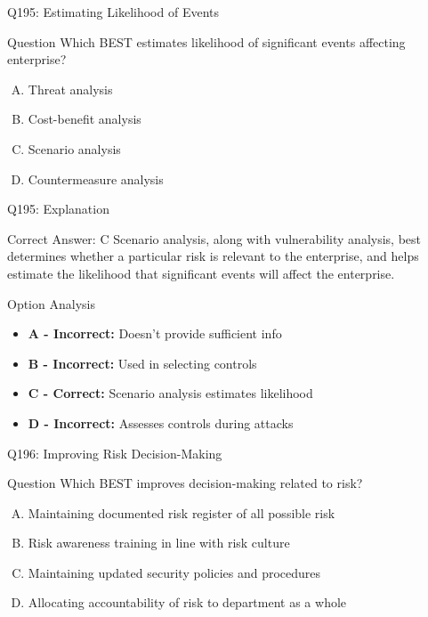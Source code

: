 \documentclass{beamer}
\begin{document}
	\begin{frame}{Q195: Estimating Likelihood of Events}
		\begin{block}{Question}
			Which BEST estimates likelihood of significant events affecting enterprise?
		\end{block}
		\begin{enumerate}[(A)]
			\item Threat analysis
			\item Cost-benefit analysis
			\item Scenario analysis
			\item Countermeasure analysis
		\end{enumerate}
	\end{frame}
	
	\begin{frame}{Q195: Explanation}
		\begin{block}{Correct Answer: C}
			Scenario analysis, along with vulnerability analysis, best determines whether a particular risk is relevant to the enterprise, and helps estimate the likelihood that significant events will affect the enterprise.
		\end{block}
		\begin{block}{Option Analysis}
			\begin{itemize}
				\item \textbf{A - Incorrect:} Doesn't provide sufficient info
				\item \textbf{B - Incorrect:} Used in selecting controls
				\item \textbf{C - Correct:} Scenario analysis estimates likelihood
				\item \textbf{D - Incorrect:} Assesses controls during attacks
			\end{itemize}
		\end{block}
	\end{frame}
	
	\begin{frame}{Q196: Improving Risk Decision-Making}
		\begin{block}{Question}
			Which BEST improves decision-making related to risk?
		\end{block}
		\begin{enumerate}[(A)]
			\item Maintaining documented risk register of all possible risk
			\item Risk awareness training in line with risk culture
			\item Maintaining updated security policies and procedures
			\item Allocating accountability of risk to department as a whole
		\end{enumerate}
	\end{frame}
	
\end{document}
